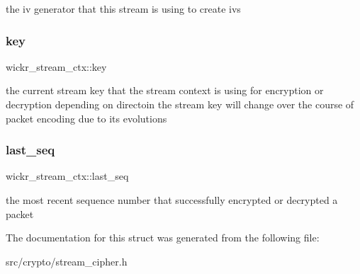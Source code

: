 the iv generator that this stream is using to create iv\textquotesingle{}s \mbox{\label{structwickr__stream__ctx_a3598b3c0415d13fafab6633f8c00a3c8}} 
\subsubsection{\texorpdfstring{key}{key}}
{\footnotesize\ttfamily wickr\+\_\+stream\+\_\+ctx\+::key}

the current stream key that the stream context is using for encryption or decryption depending on directoin the stream key will change over the course of packet encoding due to it\textquotesingle{}s evolutions \mbox{\label{structwickr__stream__ctx_abf2c6ab54e1663e6a47e310fd68b3b3f}} 
\subsubsection{\texorpdfstring{last\+\_\+seq}{last\_seq}}
{\footnotesize\ttfamily wickr\+\_\+stream\+\_\+ctx\+::last\+\_\+seq}

the most recent sequence number that successfully encrypted or decrypted a packet 

The documentation for this struct was generated from the following file\+:\begin{DoxyCompactItemize}
\item 
src/crypto/stream\+\_\+cipher.\+h\end{DoxyCompactItemize}
